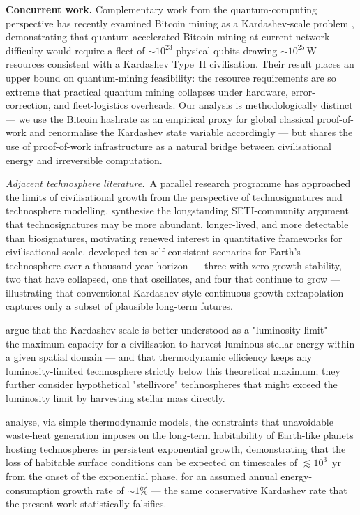 \documentclass[final,5p,times,twocolumn,authoryear]{elsarticle}
\begin{document}
\textbf{Concurrent work.} Complementary work from the quantum-computing 
perspective has recently examined Bitcoin mining as a Kardashev-scale 
problem \citep{DallaireDemers2026}, demonstrating that quantum-accelerated 
Bitcoin mining at current network difficulty would require a fleet of 
$\sim 10^{23}$ physical qubits drawing $\sim 10^{25}\,\mathrm{W}$ --- 
resources consistent with a Kardashev Type~II civilisation. Their result 
places an upper bound on quantum-mining feasibility: the resource 
requirements are so extreme that practical quantum mining collapses under 
hardware, error-correction, and fleet-logistics overheads. Our analysis 
is methodologically distinct --- we use the Bitcoin hashrate as an 
empirical proxy for global classical proof-of-work and renormalise the 
Kardashev state variable accordingly --- but shares the use of 
proof-of-work infrastructure as a natural bridge between civilisational 
energy and irreversible computation.

\textit{Adjacent technosphere literature.}~A parallel research programme has approached the limits of civilisational growth from the perspective of technosignatures and technosphere modelling. \citet{Wright2022Case} synthesise the longstanding SETI-community argument that technosignatures may be more abundant, longer-lived, and more detectable than biosignatures, motivating renewed interest in quantitative frameworks for civilisational scale. 
\citet{HaqqMisra2025Scenarios} developed ten self-consistent scenarios for Earth's technosphere over a thousand-year horizon — three with zero-growth stability, two that have collapsed, one that oscillates, and four that continue to grow — illustrating that conventional Kardashev-style continuous-growth extrapolation captures only a subset of plausible long-term futures.

\citet{HaqqMisra2025Luminosity} argue that the Kardashev scale is better understood as a "luminosity limit" — the maximum capacity for a civilisation to harvest luminous stellar energy within a given spatial domain — and that thermodynamic efficiency keeps any luminosity-limited technosphere strictly below this theoretical maximum; they further consider hypothetical "stellivore" technospheres that might exceed the luminosity limit by harvesting stellar mass directly.

\citet{Balbi2025WasteHeat} analyse, via simple thermodynamic models, the constraints that unavoidable waste-heat generation imposes on the long-term habitability of Earth-like planets hosting technospheres in persistent exponential growth, demonstrating that the loss of habitable surface conditions can be expected on timescales of $\lesssim 10^{3}$~yr from the onset of the exponential phase, for an assumed annual energy-consumption growth rate of $\sim 1\%$ --- the same conservative Kardashev rate that the present work statistically falsifies.
\end{document}
